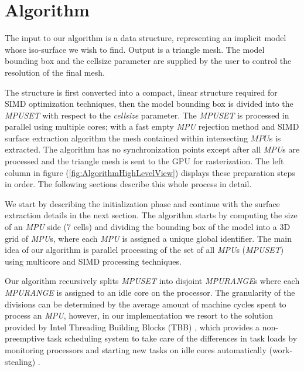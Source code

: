 \section{Algorithm}\label{sec:algorithm}
The input to our algorithm is a \blob data structure, representing an implicit model whose iso-surface we wish to find. 
Output is a triangle mesh.  The model bounding box and the cellsize parameter are supplied by the user to control 
the resolution of the final mesh.

The \blob structure is first converted into a compact, linear structure required for SIMD optimization techniques, then the model 
bounding box is divided into the \textit{MPUSET} with respect to the \textit{cellsize} parameter.
The \textit{MPUSET} is processed in parallel using multiple cores; with a fast empty \textit{MPU} rejection method and SIMD surface 
extraction algorithm the mesh contained within intersecting $MPU$s is extracted. The algorithm has no synchronization points except after 
all \textit{MPU}s are processed and the triangle mesh is sent to the GPU for rasterization. The left column in figure 
(\ref{fig:AlgorithmHighLevelView}) displays these preparation steps in order.
The following sections describe this whole process in detail.


We start by describing the initialization phase and continue with the surface extraction details in the next section.
The algorithm starts by computing the size of an \textit{MPU} side (7 cells) and dividing the bounding box of the model into a 
3D grid of \textit{MPU}s, where each \textit{MPU} is assigned a unique global identifier. The main idea of our algorithm is parallel 
processing of the set of all \textit{MPU}s (\textit{MPUSET}) using multicore and SIMD processing techniques.

Our algorithm recursively splits \textit{MPUSET} into disjoint \textit{MPURANGE}s where each \textit{MPURANGE} is assigned to an idle core on 
the processor. The granularity of the divisions can be determined by the average amount of machine cycles spent to process an \textit{MPU}, 
however, in our implementation we resort to the solution provided by Intel Threading Building Blocks (TBB) \cite{Reinders2007}, 
which provides a non-preemptive task scheduling system to take care of the differences in task loads by 
monitoring processors and starting new tasks on idle cores automatically (work-stealing) \cite{Reinders2007}.


